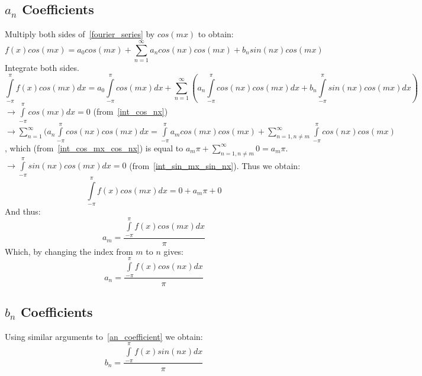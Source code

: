 \documentclass[a4paper]{article}
\begin{document}
\subsection{$a_n$ Coefficients}\label{fs:an_coefficient}
Multiply both sides of~\cref{fourier_series} by $cos(m x)$ to obtain:
$$f(x) cos(m x)= a_0 cos(m x) + \sum\limits_{n=1}^{\infty} a_n cos(n x) cos(m x) + b_n sin(n x) cos(m x)$$
Integrate both sides.
$$\int \limits_{-\pi}^{\pi}f(x) cos(m x) dx= a_0 \int \limits_{-\pi}^{\pi} cos(m x) dx 
+ \sum\limits_{n=1}^{\infty} (
a_n \int \limits_{-\pi}^{\pi}cos(n x) cos(m x) dx
+ b_n \int \limits_{-\pi}^{\pi} sin(n x) cos(m x) dx
)$$
$\rightarrow \int \limits_{-\pi}^{\pi} cos(m x) dx=0$ (from~\cref{int_cos_nx})\\
$\rightarrow \sum\limits_{n=1}^{\infty} (
a_n \int \limits_{-\pi}^{\pi}cos(n x) cos(m x) dx = \int \limits_{-\pi}^{\pi} a_m cos(m x) cos (m x) + \sum \limits_{n=1, n\neq m}^{\infty} \int \limits_{-\pi}^{\pi} cos(n x) cos(m x)$, which (from~\cref{int_cos_mx_cos_nx}) is equal to $a_m \pi + \sum \limits_{n=1, n\neq m}^{\infty} 0 = a_m \pi$.\\
$\rightarrow \int \limits_{-\pi}^{\pi} sin(n x) cos(m x) dx = 0$ (from~\cref{int_sin_mx_sin_nx}).
Thus we obtain:
$$\int \limits_{-\pi}^{\pi}f(x) cos(m x) dx = 0+a_m \pi + 0$$
And thus:
$$a_m = \frac{\int \limits_{-\pi}^{\pi} f(x) cos(m x) dx}{\pi}$$
Which, by changing the index from $m$ to $n$ gives:
\begin{equation}\label{fs:an}
a_n = \frac{\int \limits_{-\pi}^{\pi} f(x) cos(n x) dx}{\pi}
\end{equation}

\subsection{$b_n$ Coefficients}\label{fs:bn_coefficient}
Using similar arguments to~\cref{an_coefficient} we obtain:
\begin{equation}\label{fs:bn}
b_n = \frac{\int \limits_{-\pi}^{\pi} f(x) sin(n x) dx}{\pi}
\end{equation}
\end{document}

